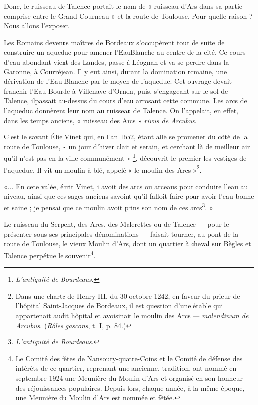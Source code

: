 Donc, le ruisseau de Talence portait le nom de « ruisseau d'Ars dans sa partie comprise entre le Grand-Courneau » et la route de Toulouse. Pour quelle raison ? Nous allons l'exposer.

Les Romains devenus maîtres de Bordeaux s'occupèrent tout de suite de construire un aqueduc pour amener l'EauBlanche au centre de la cité. Ce cours d'eau abondant vient des Landes, passe à Léognan et va se perdre dans la Garonne, à Courréjean. Il y eut ainsi, durant la domination romaine, une dérivation de l'Eau-Blanche par le moyen de l'aqueduc. Cet ouvrage devait franchir l'Eau-Bourde à Villenave-d'Ornon, puis, s'engageant sur le sol de Talence, ilpassait au-dessus du cours d'eau arrosant cette commune. Les arcs de l'aqueduc donnèrent leur nom au ruisseau de Talence. On l'appelait, en effet, dans les temps anciens, « ruisseau des Arcs » \textit{rivus de Arcubus}.

C'est le savant Élie Vinet qui, en l'an 1552, étant allé se promener du côté de la route de Toulouse, « un jour d'hiver clair et serain, et cerchant là de meilleur air qu'il n'est pas en la ville communément » \footnote{\textit{L'antiquité de Bourdeaus}.}, découvrit le premier les vestiges de l'aqueduc. Il vit un moulin à blé, appelé « le moulin des Arcs »\footnote{Dans une charte de Henry III, du 30 octobre 1242, en faveur du prieur de l'hôpital Saint-Jacques de Bordeaux, il est question d'une étable qui appartenait audit hôpital et avoisinait le moulin des Arcs — \textit{molendinum de Arcubus}. (\textit{Rôles gascons}, t. I, p. 84.)}.

«... En cete valée, écrit Vinet, i avoit des arcs ou arceaus pour conduire l'eau au niveau, ainsi que ces sages anciens savoint qu'il falloit faire pour avoir l'eau bonne et saine ; je pensai que ce moulin avoit prins son nom de ces arcs\footnote{\textit{L'antiquité de Bourdeaus}.}. »

Le ruisseau du Serpent, des Arcs, des Malerettes ou de Talence — pour le présenter sous ses principales dénominations — faisait tourner, au pont de la route de Toulouse, le vieux Moulin d'Ars, dont un quartier à cheval sur Bègles et Talence perpétue le souvenir\footnote{Le Comité des fêtes de Nansouty-quatre-Coins et le Comité de défense des intérêts de ce quartier, reprenant une ancienne. tradition, ont nommé en septembre 1924 une Meunière du Moulin d'Ars et organisé en son honneur des réjouissances populaires. Depuis lors, chaque année, à la même époque, une Meunière du Moulin d'Ars est nommée et fêtée.}.

